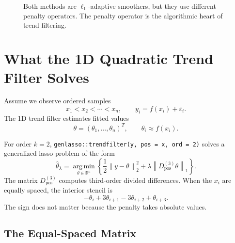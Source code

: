 \documentclass[11pt]{article}
\newcommand{\R}{\mathbb R}
\newcommand{\norm}[1]{\left\lVert #1 \right\rVert}
\newcommand{\argmin}{\operatorname*{arg\,min}}
\begin{document}
\begin{figure}[ht]
\centering
{}
\caption{Both methods are \(\ell_1\)-adaptive smoothers, but they use different
penalty operators.  The penalty operator is the algorithmic heart of trend
filtering.}
\end{figure}

\section{What the 1D Quadratic Trend Filter Solves}

Assume we observe ordered samples
\[
  x_1 < x_2 < \cdots < x_n,
  \qquad y_i = f(x_i) + \varepsilon_i.
\]
The 1D trend filter estimates fitted values
\[
  \theta = (\theta_1,\ldots,\theta_n)^T,
  \qquad \theta_i \approx f(x_i).
\]

For order \(k=2\), \texttt{genlasso::trendfilter(y, pos = x, ord = 2)}
solves a generalized lasso problem of the form
\[
  \widehat\theta_\lambda
  =
  \argmin_{\theta\in\R^n}
  \left\{
    \frac{1}{2}\norm{y-\theta}_2^2
    +
    \lambda\norm{D^{(3)}_{\mathrm{pos}}\theta}_1
  \right\}.
\]
The matrix \(D^{(3)}_{\mathrm{pos}}\) computes third-order divided differences.
When the \(x_i\) are equally spaced, the interior stencil is
\[
  -\theta_i + 3\theta_{i+1} - 3\theta_{i+2} + \theta_{i+3}.
\]
The sign does not matter because the penalty takes absolute values.

\subsection{The Equal-Spaced Matrix}
\end{document}
